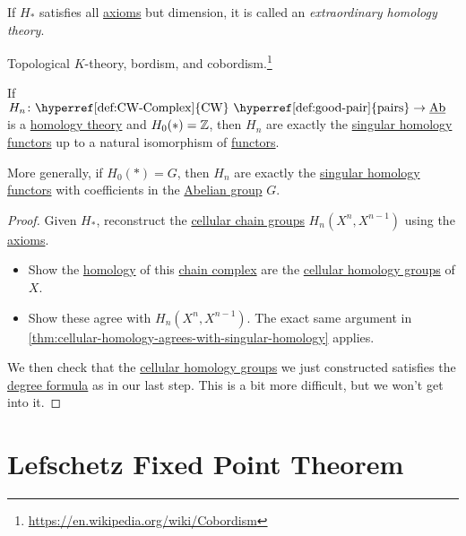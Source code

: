 \begin{definition}\label{def:extraordinary-homology-theory}
	If \(H_\ast\) satisfies all \hyperref[def:homology-theory]{axioms} but dimension, it is called an \emph{extraordinary homology theory}.
\end{definition}
\begin{eg}
	Topological \(K\)-theory, bordism, and cobordism.\footnote{\url{https://en.wikipedia.org/wiki/Cobordism}}
\end{eg}

\begin{theorem}\label{thm:characterization-of-singular-homology}
	If \(H_n \colon \text{\hyperref[def:CW-Complex]{CW} \hyperref[def:good-pair]{pairs}} \to \underline{\mathrm{Ab}}\) is a
	\hyperref[def:homology-theory]{homology theory} and \(H_0(\ast) = \mathbb{\MakeUppercase{z}}\), then \(H_n\) are exactly
	the \hyperref[def:singular-homology-group]{singular homology} \hyperref[def:functor]{functors} up to a natural isomorphism of \hyperref[def:functor]{functors}.

	More generally, if \(H_0(\ast) = G\), then \(H_n\) are exactly the
	\hyperref[def:singular-homology-group]{singular homology} \hyperref[def:functor]{functors} with coefficients in the
	\hyperref[def:Abelian-group]{Abelian group} \(G\).
\end{theorem}
\begin{proof}
	Given \(H_\ast\), reconstruct the \hyperref[def:cellular-chain-complex]{cellular chain groups} \(H_n(X^n, X^{n-1})\) using the
	\hyperref[def:homology-theory]{axioms}.
	\begin{itemize}
		\item Show the \hyperref[def:homology-theory]{homology} of this \hyperref[def:chain-complex]{chain complex} are
		      the \hyperref[def:cellular-homology-group]{cellular homology groups} of \(X\).
		\item Show these agree with \(H_{n} (X^n, X^{n-1})\). The exact same argument in \autoref{thm:cellular-homology-agrees-with-singular-homology} applies.
	\end{itemize}

	We then check that the \hyperref[def:cellular-homology-group]{cellular homology groups} we just constructed satisfies the
	\hyperref[thm:calculation-with-local-degree]{degree formula} as in our last step. This is a bit more difficult, but we won't get into it.
\end{proof}

\chapter{Lefschetz Fixed Point Theorem}
